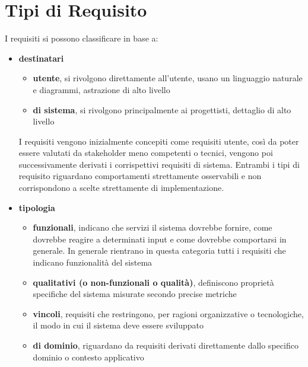 \section{Tipi di Requisito}
\label{section:req-types}
I requisiti si possono classificare in base a:
\begin{itemize}
    \item \textbf{destinatari}
    \begin{itemize}
        \item \textbf{utente}, si rivolgono direttamente all'utente, usano un linguaggio naturale e diagrammi, astrazione di alto livello
        \item \textbf{di sistema}, si rivolgono principalmente ai progettisti, dettaglio di alto livello
    \end{itemize}
    I requisiti vengono inizialmente concepiti come requisiti utente, così da poter essere valutati da stakeholder meno competenti o tecnici, vengono poi successivamente derivati i corrispettivi requisiti di sistema. Entrambi i tipi di requisito riguardano comportamenti strettamente osservabili e non corrispondono a scelte strettamente di implementazione.
    \item \textbf{tipologia}
    \begin{itemize}
        \item \textbf{funzionali}, indicano che servizi il sistema dovrebbe fornire, come dovrebbe reagire a determinati input e come dovrebbe comportarsi in generale. In generale rientrano in questa categoria tutti i requisiti che indicano funzionalità del sistema
        \item \textbf{qualitativi (o non-funzionali o qualità)}, definiscono proprietà specifiche del sistema misurate secondo precise metriche
        \item \textbf{vincoli}, requisiti che restringono, per ragioni organizzative o tecnologiche, il modo in cui il sistema deve essere sviluppato
        \item \textbf{di dominio}, riguardano da requisiti derivati direttamente dallo specifico dominio o contesto applicativo
    \end{itemize}
\end{itemize}
